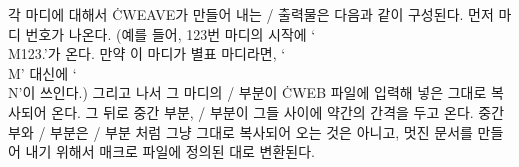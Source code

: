 각 마디에 대해서 \.{CWEAVE}가 만들어 내는 \TEX/ 출력물은 다음과 같이 구성된다. 먼저 마디
번호가 나온다. (예를 들어, 123번 마디의 시작에 `\.{\\M123.}'가 온다. 만약 이 마디가 별표
마디라면, `\.{\\M}' 대신에 `\.{\\N}'이 쓰인다.) 그리고 나서 그 마디의 \TEX/ 부분이
\.{CWEB} 파일에 입력해 넣은 그대로 복사되어 온다. 그 뒤로 중간 부분, \CEE/ 부분이 그들
사이에 약간의 간격을 두고 온다. 중간부와 \CEE/ 부분은 \TEX/ 부분 처럼 그냥 그대로 복사되어
오는 것은 아니고, 멋진 문서를 만들어 내기 위해서 매크로 파일에 정의된 대로 변환된다.


